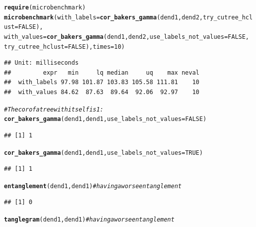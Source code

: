 \documentclass[shortnames,nojss,article]{jss}\usepackage[]{graphicx}\usepackage[]{color}
\makeatletter
\newcommand{\hlnum}[1]{\textcolor[rgb]{0.686,0.059,0.569}{#1}}%
\newcommand{\hlcom}[1]{\textcolor[rgb]{0.678,0.584,0.686}{\textit{#1}}}%
\newcommand{\hlstd}[1]{\textcolor[rgb]{0.345,0.345,0.345}{#1}}%
\newcommand{\hlkwc}[1]{\textcolor[rgb]{0.333,0.667,0.333}{#1}}%
\newcommand{\hlkwd}[1]{\textcolor[rgb]{0.737,0.353,0.396}{\textbf{#1}}}%
\newenvironment{kframe}{%
 \def\at@end@of@kframe{}%
 \ifinner\ifhmode%
  \def\at@end@of@kframe{\end{minipage}}%
  \begin{minipage}{\columnwidth}%
 \fi\fi%
 \def\FrameCommand##1{\hskip\@totalleftmargin \hskip-\fboxsep
 \colorbox{shadecolor}{##1}\hskip-\fboxsep
     \hskip-\linewidth \hskip-\@totalleftmargin \hskip\columnwidth}%
 \MakeFramed {\advance\hsize-\width
   \@totalleftmargin\z@ \linewidth\hsize
   \@setminipage}}%
 {\par\unskip\endMakeFramed%
 \at@end@of@kframe}
\newenvironment{knitrout}{}{} %
\makeatother
\begin{document}
\begin{knitrout}
\begin{kframe}
\begin{alltt}
\hlkwd{require}\hlstd{(microbenchmark)}
\hlkwd{microbenchmark}\hlstd{(}\hlkwc{with_labels} \hlstd{=} \hlkwd{cor_bakers_gamma}\hlstd{(dend1, dend2,} \hlkwc{try_cutree_hclust} \hlstd{=} \hlnum{FALSE}\hlstd{),}
    \hlkwc{with_values} \hlstd{=} \hlkwd{cor_bakers_gamma}\hlstd{(dend1, dend2,} \hlkwc{use_labels_not_values} \hlstd{=} \hlnum{FALSE}\hlstd{,}
        \hlkwc{try_cutree_hclust} \hlstd{=} \hlnum{FALSE}\hlstd{),} \hlkwc{times} \hlstd{=} \hlnum{10}\hlstd{)}
\end{alltt}
\begin{verbatim}
## Unit: milliseconds
##         expr   min     lq median     uq    max neval
##  with_labels 97.98 101.87 103.83 105.58 111.81    10
##  with_values 84.62  87.63  89.64  92.06  92.97    10
\end{verbatim}
\begin{alltt}
\hlcom{# The cor of a tree with itself is 1:}
\hlkwd{cor_bakers_gamma}\hlstd{(dend1, dend1,} \hlkwc{use_labels_not_values} \hlstd{=} \hlnum{FALSE}\hlstd{)}
\end{alltt}
\begin{verbatim}
## [1] 1
\end{verbatim}
\begin{alltt}
\hlkwd{cor_bakers_gamma}\hlstd{(dend1, dend1,} \hlkwc{use_labels_not_values} \hlstd{=} \hlnum{TRUE}\hlstd{)}
\end{alltt}
\begin{verbatim}
## [1] 1
\end{verbatim}
\begin{alltt}
\hlkwd{entanglement}\hlstd{(dend1, dend1)}  \hlcom{# having a worse entanglement }
\end{alltt}
\begin{verbatim}
## [1] 0
\end{verbatim}
\begin{alltt}
\hlkwd{tanglegram}\hlstd{(dend1, dend1)}  \hlcom{# having a worse entanglement }
\end{alltt}
\end{kframe}


\end{knitrout}
\end{document}
